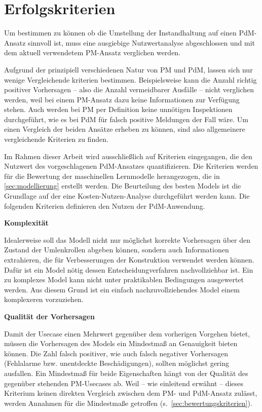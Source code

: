 \section{Erfolgskriterien}
\label{sec:erfolgskriterien_usecase}
Um bestimmen zu können ob die Umstellung der Instandhaltung auf einen PdM-Ansatz sinnvoll ist, muss eine ausgiebige Nutzwertanalyse abgeschlossen und mit dem aktuell verwendetem PM-Ansatz verglichen werden. 

Aufgrund der prinzipiell verschiedenen Natur von PM und PdM, lassen sich nur wenige Vergleichende kriterien bestimmen. Beispielsweise kann die Anzahl richtig positiver Vorhersagen -- also die Anzahl vermeidbarer Ausfälle -- nicht verglichen werden, weil bei einem PM-Ansatz dazu keine Informationen zur Verfügung stehen. Auch werden bei PM per Definition keine unnötigen Inspektionen durchgeführt, wie es bei PdM für falsch positive Meldungen der Fall wäre. Um einen Vergleich der beiden Ansätze erheben zu können, sind also allgemeinere vergleichende Kriterien zu finden.

Im Rahmen dieser Arbeit wird ausschließlich auf Kriterien eingegangen, die den Nutzwert des vorgeschlagenen PdM-Ansatzes quantifizieren. Die Kriterien werden für die Bewertung der maschinellen Lernmodelle herangezogen, die in \cref{sec:modellierung} erstellt werden. Die Beurteilung des besten Models ist die Grundlage auf der eine Kosten-Nutzen-Analyse durchgeführt werden kann. Die folgenden Kriterien definieren den Nutzen der PdM-Anwendung.

\textbf{Komplexität}

Idealerweise soll das Modell nicht nur möglichst korrekte Vorhersagen über den Zustand der Umlenkrollen abgeben können, sondern auch Informationen extrahieren, die für Verbesserungen der Konstruktion verwendet werden können. Dafür ist ein Model nötig dessen Entscheidungverfahren nachvollziehbar ist. Ein zu komplexes Model kann nicht unter praktikablen Bedingungen ausgewertet werden. Aus diesem Grund ist ein einfach nachzuvollziehendes Model einem komplexeren vorzuziehen.

\textbf{Qualität der Vorhersagen}

Damit der Usecase einen Mehrwert gegenüber dem vorherigen Vorgehen bietet, müssen die Vorhersagen des Models ein Mindestmaß an Genauigkeit bieten können. Die Zahl falsch positiver, wie auch falsch negativer Vorhersagen (Fehlalarme bzw. unentdeckte Beschädigungen), sollten möglichst gering ausfallen. Ein Mindestmaß für beide Eigenschaften hängt von der Qualität des gegenüber stehenden PM-Usecases ab. Weil -- wie einleitend erwähnt -- dieses Kriterium keinen direkten Vergleich zwischen dem PM- und PdM-Ansatz zulässt, werden Annahmen für die Mindestmaße getroffen (s.~\cref{sec:bewertungskriterien}).

